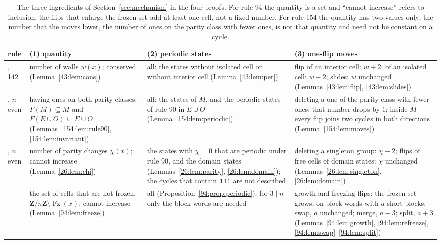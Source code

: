 \documentclass[10pt,a4paper]{article}
\newcommand{\Zn}{\mathbf{Z}/n\mathbf{Z}}      %
\newcommand{\code}[1]{\mathtt{#1}}            %
\newcommand{\Fz}{\operatorname{Fz}}           %
\begin{document}
\begin{table}[!htb]
\centering\small
\begin{tabular}{@{}>{\raggedright\arraybackslash}p{}>{\raggedright\arraybackslash}p{}>{\raggedright\arraybackslash}p{}>{\raggedright\arraybackslash}p{}@{}}
\hline
rule & (1) quantity & (2) periodic states & (3) one-flip moves \\
\hline
43, 142 & number of walls $w(x)$; conserved (Lemma~\ref{43:lem:cons}) &
all: the states without isolated cell or without interior cell (Lemma~\ref{43:lem:per}) &
flip of an interior cell: $w+2$; of an isolated cell: $w-2$; slides: $w$ unchanged
(Lemmas~\ref{43:lem:flip}, \ref{43:lem:slides}) \\
154, $n$ even & having ones on both parity classes: $F(M)\subseteq M$ and $F(E\cup O)\subseteq E\cup O$
(Lemmas~\ref{154:lem:rule90}, \ref{154:lem:invariant}) &
all: the states of $M$, and the periodic states of rule 90 in $E\cup O$ (Lemma~\ref{154:lem:periodic}) &
deleting a one of the parity class with fewer ones: that number drops by $1$; inside $M$ every flip joins two
cycles in both directions (Lemma~\ref{154:lem:moves}) \\
26, $n$ even & number of parity changes $\chi(x)$; cannot increase (Lemma~\ref{26:lem:chi}) &
the states with $\chi=0$ that are periodic under rule 90, and the domain states (Lemmas~\ref{26:lem:parity},
\ref{26:lem:domain}); the cycles that contain $\code{111}$ are not described &
deleting a singleton group: $\chi-2$; flips of free cells of domain states: $\chi$ unchanged
(Lemmas~\ref{26:lem:singleton}, \ref{26:lem:domain}) \\
94 & the set of cells that are not frozen, $\Zn\setminus\Fz(x)$; cannot increase (Lemma~\ref{94:lem:freeze}) &
all (Proposition~\ref{94:prop:periodic}); for $3\mid n$ only the block words are needed &
growth and freezing flips: the frozen set grows; on block words with $a$ short blocks: swap, $a$ unchanged; merge,
$a-3$; split, $a+3$ (Lemmas~\ref{94:lem:growth}, \ref{94:lem:refreeze}, \ref{94:lem:swap}--\ref{94:lem:split}) \\
\hline
\end{tabular}
\caption{The three ingredients of Section~\ref{sec:mechanism} in the four proofs. For rule 94 the quantity is a set
and ``cannot increase'' refers to inclusion; the flips that enlarge the frozen set add at least one cell, not a fixed
number. For rule 154 the quantity has two values only; the number that the moves lower, the number of ones on the
parity class with fewer ones, is not that quantity and need not be constant on a cycle.}
\label{tab:mech}
\end{table}
\end{document}
